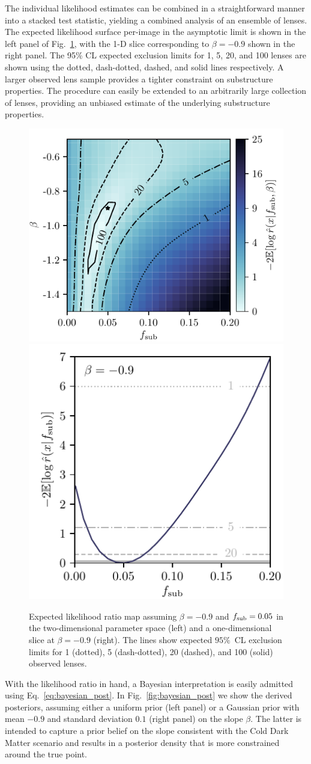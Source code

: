 \documentclass[twocolumn]{aastex62}
\begin{document}
The individual likelihood estimates can be combined in a straightforward manner into a stacked test statistic, yielding a combined analysis of an ensemble of lenses. The expected likelihood surface per-image in the asymptotic limit is shown in the left panel of Fig.~\ref{fig:expected_likelihood}, with the 1-D slice corresponding to $\beta = -0.9$ shown in the right panel. The 95\% CL expected exclusion limits for 1, 5, 20, and 100 lenses are shown using the dotted, dash-dotted, dashed, and solid lines respectively. A larger observed lens sample provides a tighter constraint on substructure properties. The procedure can easily be extended to an arbitrarily large collection of lenses, providing an unbiased estimate of the underlying substructure properties.

\begin{figure}
\centering
\includegraphics[height=0.4\textwidth]{figures/expected_likelihood_map}
\includegraphics[height=0.4\textwidth]{figures/expected_likelihood_slice}
\caption{Expected likelihood ratio map assuming $\beta = -0.9$ and $f_{\mathrm{sub}} = 0.05$ in the two-dimensional parameter space (left) and a one-dimensional slice at $\beta = -0.9$ (right). The lines show expected $95\%$~CL exclusion limits for 1 (dotted), 5 (dash-dotted), 20 (dashed), and 100 (solid) observed lenses. }
\label{fig:expected_likelihood}
\end{figure}

With the likelihood ratio in hand, a Bayesian interpretation is easily admitted using Eq.~\ref{eq:bayesian_post}. In Fig.~\ref{fig:bayesian_post} we show the derived posteriors, assuming either a uniform prior (left panel) or a Gaussian prior with mean $-0.9$ and standard deviation $0.1$ (right panel) on the slope $\beta$. The latter is intended to capture a prior belief on the slope consistent with the Cold Dark Matter scenario and results in a posterior density that is more constrained around the true point.
\end{document}
